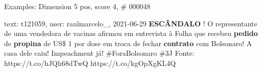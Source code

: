 \begin{frame}{Examples: Dimension 5 pos, score 4, \# 000048}
\footnotesize
\begin{exampleblock}{text: t121059, user: raulmarcelo\_, 2021-06-29}
\textbf{ESCÂNDALO} ! O representante de uma vendedora de vacinas afirmou em 
entrevista à Folha que recebeu \textbf{pedido} de \textbf{propina} de US\$ 1 
por dose em troca de fechar \textbf{contrato} com Bolsonaro! A casa dele caiu! 
Impeachment já! \#ForaBolsonaro \#3J Fonte: https://t.co/hJQh68dTwQ 
https://t.co/kgOpXgKL4Q 
\end{exampleblock}
\end{frame}
